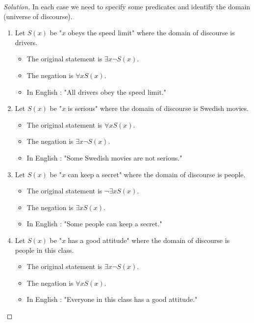 \documentclass{article}
\newenvironment{solution}{\renewcommand\qedsymbol{}\begin{proof}[Solution]}{\end{proof}}
\begin{document}
\begin{solution}
In each case we need to specify some predicates and identify the domain (universe of discourse). 

\begin{enumerate}[leftmargin=16pt, topsep = 8pt]
\item Let $S(x)$ be "$x$ obeys the speed limit" where the domain of discourse is drivers.
\begin{itemize}[leftmargin=0pt, topsep = 0pt]
\item The original statement is $\exists x \neg S(x)$.
\item The negation is $\forall xS(x)$.
\item In English : "All drivers obey the speed limit."
\end{itemize}
\item Let $S(x)$ be "$x$ is serious" where the domain of discourse is Swedish movies.
\begin{itemize}[leftmargin=0pt, topsep = 0pt]
\item The original statement is $\forall xS(x)$.
\item The negation is $\exists x \neg S(x)$.
\item In English : "Some Swedish movies are not serious."
\end{itemize}
\item Let $S(x)$ be "$x$ can keep a secret" where the domain of discourse is people.
\begin{itemize}[leftmargin=0pt, topsep = 0pt]
\item The original statement is $\neg \exists xS(x)$.
\item The negation is $\exists xS(x)$.
\item In English : "Some people can keep a secret."
\end{itemize}
\item Let $S(x)$ be "$x$ has a good attitude" where the domain of discourse is people in this class.
\begin{itemize}[leftmargin=0pt, topsep = 0pt]
\item The original statement is $\exists x \neg S(x)$.
\item The negation is $\forall xS(x)$.
\item In English : "Everyone in this class has a good attitude."
\end{itemize}
\end{enumerate}
\end{solution}
\end{document}
